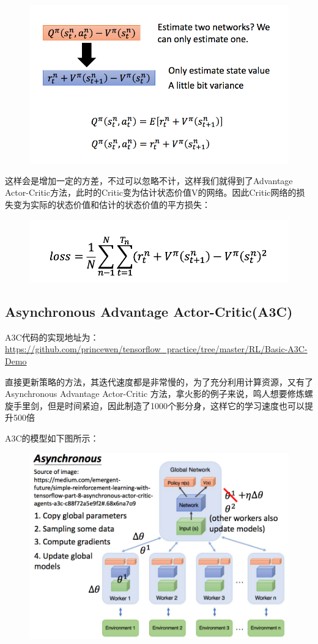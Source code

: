 \documentclass[UTF8,a4paper,12pt]{ctexbook}
\begin{document}
			\begin{figure}[H]
			\centering
			\includegraphics[width=.9\linewidth]{PG09}
			\end{figure}				
			这样会是增加一定的方差，不过可以忽略不计，这样我们就得到了Advantage Actor-Critic方法，此时的Critic变为估计状态价值V的网络。因此Critic网络的损失变为实际的状态价值和估计的状态价值的平方损失：
			
			\begin{figure}[H]
			\centering
			\includegraphics[width=.9\linewidth]{PG0}
			\end{figure}				
			
		\subsection{Asynchronous  Advantage  Actor-Critic(A3C)}
			A3C代码的实现地址为：\url{https://github.com/princewen/tensorflow_practice/tree/master/RL/Basic-A3C-Demo}
		
			直接更新策略的方法，其迭代速度都是非常慢的，为了充分利用计算资源，又有了Asynchronous Advantage Actor-Critic 方法，拿火影的例子来说，鸣人想要修炼螺旋手里剑，但是时间紧迫，因此制造了1000个影分身，这样它的学习速度也可以提升500倍
			
			A3C的模型如下图所示：
			\begin{figure}[H]
			\centering
			\includegraphics[width=.9\linewidth]{A3C}
			\end{figure}				
			
\end{document}
